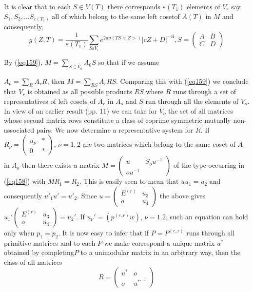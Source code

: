 It is clear that to each $S \in V (T)$ there corresponds $\varepsilon
(T_1)$ elements of $V_r$ say $S_1, S_2, \ldots S_{\varepsilon (T_1)}$
all of which belong to the same left coset\pageoriginale  of $A (T)$
in $M$ and consequently, 
$$
g (Z, T) = \frac{1}{\varepsilon (T_1)} \sum_{S \varepsilon V_r} e^{2
  \pi \sigma (TS < Z > )} | cZ + D |^{-\mathfrak{K}}, S
= \begin{pmatrix} A & B \\ C & D \end{pmatrix} 
$$

By (\ref{eq159}), $M = \sum_{S \in V_o} A_0 S$ so that if we assume 

$A_o = \sum_{R} A_r R$, then $M = \sum_{R S} A_r R S$. Comparing this
with (\ref{eq159}) we conclude that $V_r$ is obtained as all possible
products $RS$ where $R$ runs through a set of representatives of left
cosets of $A_r$ in $A_o$ and $S$ run through all the elements of
$V_o$. In view of an earlier result (pp. 11) we can take for $V_o$
the set of all matrices whose second matrix rows constitute a class of
coprime symmetric mutually non-associated pairs. We now determine a
representative system for $R$. If $R_\nu = \begin{pmatrix} u_\nu & *
  \\ 0 & * \end{pmatrix}$, $\nu = 1, 2$ are two matrices which belong
to the same coset of $A$ in $A_o$ then there exists a matrix $M
= \begin{pmatrix} u & S_o u^{-1} \\ o u^{-1} \end{pmatrix}$ of the
type occurring in (\ref{eq158}) with $MR_1 = R_2$. This is easily seen to
mean that $u u_1 = u_2$ and consequently $u'_1 u' = u'_2$. Since
$u = \begin{pmatrix} E^{(r)} & u_3 \\ o & u_4 \end{pmatrix}$ the above
gives $ u_1{'} \begin{pmatrix} E^{(r)} & u_3 \\ o & u_4 \end{pmatrix}
= u_2{'}$. If  $u_{\nu}' = (p^{(r, r)} w)$, $\nu = 1. 2$, such an
equation can hold only when $p_1 = p_2$. It is now easy to infer that
if $P = P^{(r, r)}$ runs through all primitive matrices and to each
$P$ we make correspond a unique matrix $u^\ast$ obtained by
completing\pageoriginale  $P$ to a unimodular matrix in an arbitrary
way, then the class of all matrices  
\begin{equation*}
R = 
\begin{pmatrix}
u^* & o \\
o & u^{*'^{-1} }
\end{pmatrix} \tag{161}\label{eq161}
\end{equation*}
